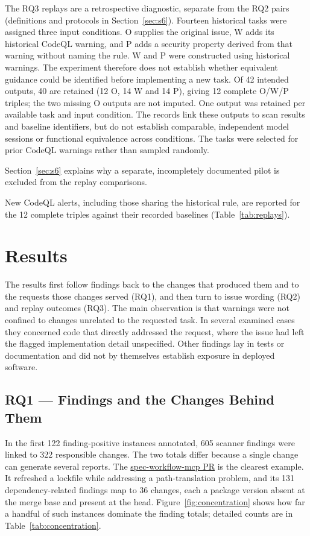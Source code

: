 \documentclass[acmsmall,screen,nonacm]{acmart}
\begin{document}
The RQ3 replays are a retrospective diagnostic, separate from the RQ2 pairs (definitions and protocols in Section~\ref{sec:s6}). Fourteen historical tasks were assigned three input conditions. O supplies the original issue, W adds its historical CodeQL warning, and P adds a security property derived from that warning without naming the rule. W and P were constructed using historical warnings. The experiment therefore does not establish whether equivalent guidance could be identified before implementing a new task. Of 42 intended outputs, 40 are retained (12 O, 14 W and 14 P), giving 12 complete O/W/P triples; the two missing O outputs are not imputed. One output was retained per available task and input condition. The records link these outputs to scan results and baseline identifiers, but do not establish comparable, independent model sessions or functional equivalence across conditions. The tasks were selected for prior CodeQL warnings rather than sampled randomly.

Section~\ref{sec:s6} explains why a separate, incompletely documented pilot is excluded from the replay comparisons.

New CodeQL alerts, including those sharing the historical rule, are reported for the 12 complete triples against their recorded baselines (Table~\ref{tab:replays}). 

\section{Results}

The results first follow findings back to the changes that produced them and to the requests those changes served (RQ1), and then turn to issue wording (RQ2) and replay outcomes (RQ3). The main observation is that warnings were not confined to changes unrelated to the requested task. In several examined cases they concerned code that directly addressed the request, where the issue had left the flagged implementation detail unspecified. Other findings lay in tests or documentation and did not by themselves establish exposure in deployed software.

\subsection{RQ1 --- Findings and the Changes Behind Them}\label{sec:rq1-roles}

In the first 122 finding-positive instances annotated, 605 scanner findings were linked to 322 responsible changes. The two totals differ because a single change can generate several reports. The \href{https://github.com/Pimzino/spec-workflow-mcp/pull/173}{spec-workflow-mcp PR} is the clearest example. It refreshed a lockfile while addressing a path-translation problem, and its 131 dependency-related findings map to 36 changes, each a package version absent at the merge base and present at the head. Figure~\ref{fig:concentration} shows how far a handful of such instances dominate the finding totals; detailed counts are in Table~\ref{tab:concentration}.
\end{document}
